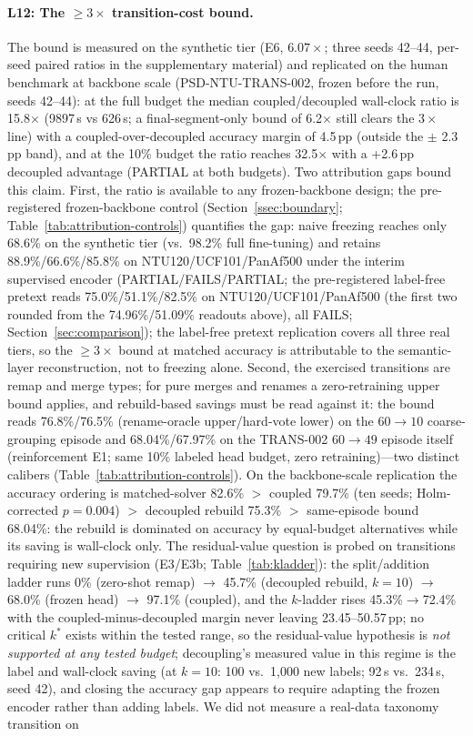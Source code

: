 \paragraph{L12: The $\geq 3\times$ transition-cost bound.}
The bound is measured on the synthetic tier (E6, $6.07\times$; three seeds 42--44, per-seed paired ratios in the supplementary material) and replicated on the human benchmark at backbone scale (PSD-NTU-TRANS-002, frozen before the run, seeds 42--44): at the full budget the median coupled/decoupled wall-clock ratio is 15.8$\times$ (9897\,s vs 626\,s; a final-segment-only bound of 6.2$\times$ still clears the $3\times$ line) with a coupled-over-decoupled accuracy margin of 4.5\,pp (outside the $\pm$ 2.3\,pp band), and at the 10\% budget the ratio reaches 32.5$\times$ with a +2.6\,pp decoupled advantage (PARTIAL at both budgets). Two attribution gaps bound this claim. First, the ratio is available to any frozen-backbone design; the pre-registered frozen-backbone control (Section~\ref{ssec:boundary}; Table~\ref{tab:attribution-controls}) quantifies the gap: naive freezing reaches only 68.6\% on the synthetic tier (vs.\ 98.2\% full fine-tuning) and retains 88.9\%/66.6\%/85.8\% on NTU120/UCF101/PanAf500 under the interim supervised encoder (PARTIAL/FAILS/PARTIAL; the pre-registered label-free pretext reads 75.0\%/51.1\%/82.5\% on NTU120/UCF101/PanAf500 (the first two rounded from the 74.96\%/51.09\% readouts above), all FAILS; Section~\ref{sec:comparison}); the label-free pretext replication covers all three real tiers, so the $\geq 3\times$ bound at matched accuracy is attributable to the semantic-layer reconstruction, not to freezing alone. Second, the exercised transitions are remap and merge types; for pure merges and renames a zero-retraining upper bound applies, and rebuild-based savings must be read against it: the bound reads 76.8\%/76.5\% (rename-oracle upper/hard-vote lower) on the $60\to10$ coarse-grouping episode and 68.04\%/67.97\% on the TRANS-002 $60\to49$ episode itself (reinforcement E1; same 10\% labeled head budget, zero retraining)---two distinct calibers (Table~\ref{tab:attribution-controls}). On the backbone-scale replication the accuracy ordering is matched-solver 82.6\% $>$ coupled 79.7\% (ten seeds; Holm-corrected $p=0.004$) $>$ decoupled rebuild 75.3\% $>$ same-episode bound 68.04\%: the rebuild is dominated on accuracy by equal-budget alternatives while its saving is wall-clock only. The residual-value question is probed on transitions requiring new supervision (E3/E3b; Table~\ref{tab:kladder}): the split/addition ladder runs 0\% (zero-shot remap) $\to$ 45.7\% (decoupled rebuild, $k{=}10$) $\to$ 68.0\% (frozen head) $\to$ 97.1\% (coupled), and the $k$-ladder rises 45.3\%$\to$72.4\% with the coupled-minus-decoupled margin never leaving 23.45--50.57\,pp; no critical $k^{\ast}$ exists within the tested range, so the residual-value hypothesis is \emph{not supported at any tested budget}; decoupling's measured value in this regime is the label and wall-clock saving (at $k{=}10$: 100 vs.\ 1{,}000 new labels; 92\,s vs.\ 234\,s, seed 42), and closing the accuracy gap appears to require adapting the frozen encoder rather than adding labels. We did not measure a real-data taxonomy transition on 